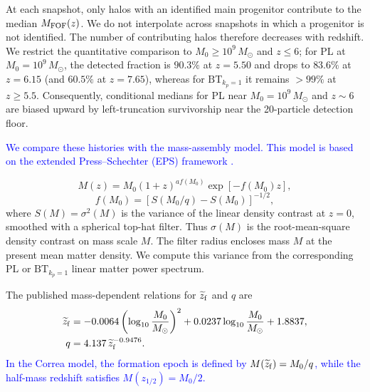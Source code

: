 \documentclass[
 reprint,
 superscriptaddress,
 nofootinbib,
 nobibnotes,
 amsmath,
 amssymb,
 aps,
 prd,
 floatfix,
 longbibliography
]{revtex4-2}
\DeclareRobustCommand{\change}[1]{\textcolor{blue}{#1}}
\DeclareRobustCommand{\BTKPone}{\ensuremath{\mathrm{BT}_{k_p=1}}}
\begin{document}
At each snapshot, only halos with an identified main progenitor contribute to the median \(M_{\rm FOF}(z)\). We do not interpolate across snapshots in which a progenitor is not identified. The number of contributing halos therefore decreases with redshift. We restrict the quantitative comparison to \(M_0\ge10^9\,M_\odot\) and \(z\le6\); for PL at \(M_0=10^9\,M_\odot\), the detected fraction is \(90.3\%\) at \(z=5.50\) and drops to \(83.6\%\) at \(z=6.15\) (and \(60.5\%\) at \(z=7.65\)), whereas for \BTKPone{} it remains \(>99\%\) at \(z\ge5.5\). Consequently, conditional medians for PL near \(M_0=10^9\,M_\odot\) and \(z\sim6\) are biased upward by left-truncation survivorship near the 20-particle detection floor.

\change{We compare these histories with the \citet{Correa2015MAHI} mass-assembly model. This model is based on the extended Press--Schechter (EPS) framework \citep{Bond1991ExcursionSet,LaceyCole1993MergerRates}.}

\begin{equation}
\label{eq:correa2015_mah}
M(z)=M_0(1+z)^{a f(M_0)}\exp[-f(M_0)z],
\end{equation}
\begin{equation}
\label{eq:correa2015_fm0}
f(M_0)=\left[S(M_0/q)-S(M_0)\right]^{-1/2},
\end{equation}
where \(S(M)=\sigma^2(M)\) is the variance of the linear density contrast at \(z=0\), smoothed with a spherical top-hat filter. Thus \(\sigma(M)\) is the root-mean-square density contrast on mass scale \(M\). The filter radius encloses mass \(M\) at the present mean matter density. We compute this variance from the corresponding PL or \BTKPone{} linear matter power spectrum.

The published mass-dependent relations for \(\widetilde z_{\rm f}\) and \(q\) are
\begin{equation}
\begin{aligned}
\widetilde z_{\rm f}&=-0.0064\left(\log_{10}\frac{M_0}{M_\odot}\right)^2
+0.0237\log_{10}\frac{M_0}{M_\odot}+1.8837,\\
q&=4.137\,\widetilde z_{\rm f}^{-0.9476}.
\end{aligned}
\label{eq:correa_q_closure}
\end{equation}
\change{In the Correa model, the formation epoch is defined by \(M(\widetilde z_{\rm f})=M_0/q\), while the half-mass redshift satisfies \(M(z_{1/2})=M_0/2\).}
\end{document}
